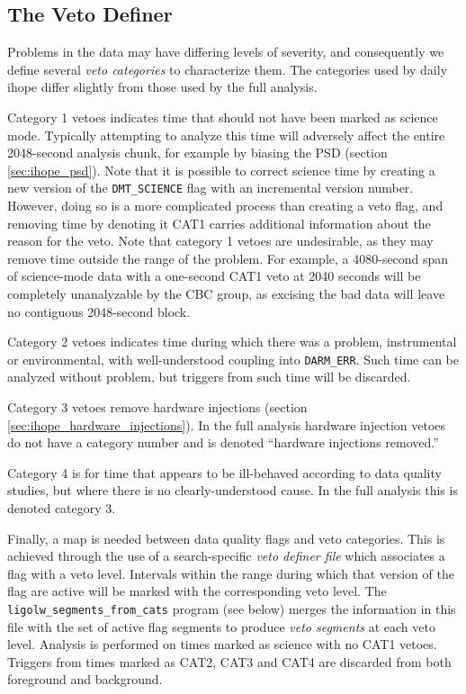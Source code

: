 \subsection{The Veto Definer}

Problems in the data may have differing levels of severity, and
consequently we define several \emph{veto categories} to characterize
them.  The categories used by daily ihope differ slightly from those
used by the full analysis.

Category 1 vetoes indicates time that should not have been marked as
science mode.  Typically attempting to analyze this time will
adversely affect the entire 2048-second analysis chunk, for example by
biasing the PSD (section \ref{sec:ihope_psd}).  Note that it is
possible to correct science time by creating a new version of the
\texttt{DMT\_SCIENCE} flag with an incremental version number.
However, doing so is a more complicated process than creating a veto
flag, and removing time by denoting it CAT1 carries additional
information about the reason for the veto.  Note that category 1
vetoes are undesirable, as they may remove time outside the range of
the problem.  For example, a 4080-second span of science-mode data
with a one-second CAT1 veto at 2040 seconds will be completely
unanalyzable by the CBC group, as excising the bad data will leave no
contiguous 2048-second block.

Category 2 vetoes indicates time during which there was a problem,
instrumental or environmental, with well-understood coupling into
\texttt{DARM\_ERR}.  Such time can be analyzed without problem, but
triggers from such time will be discarded. 

Category 3 vetoes remove hardware injections (section
\ref{sec:ihope_hardware_injections}).  In the full analysis hardware
injection vetoes do not have a category number and is denoted
``hardware injections removed.''

Category 4 is for time that appears to be ill-behaved according to 
data quality studies, but where there is no clearly-understood 
cause.  In the full analysis this is denoted category 3.

Finally, a map is needed between data quality flags and veto
categories.  This is achieved through the use of a search-specific
\emph{veto definer file} which associates a flag with a veto level.
Intervals within the range during which that version of the flag are
active will be marked with the corresponding veto level.  The
\texttt{ligolw\_segments\_from\_cats} program (see below) merges the
information in this file with the set of active flag segments to produce
\emph{veto segments} at each veto level.  Analysis is performed on
times marked as science with no CAT1 vetoes.  Triggers from times
marked as CAT2, CAT3 and CAT4 are discarded from both foreground and
background.

